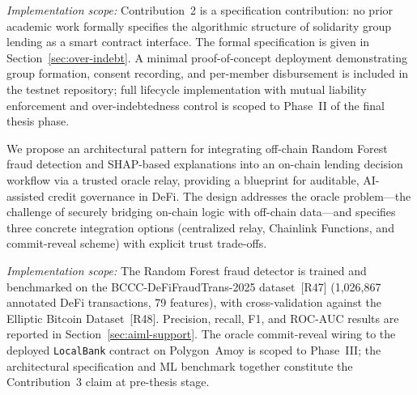 \documentclass[12pt,a4paper]{report}
\begin{document}
\begin{description}[leftmargin=0pt]
\textit{Implementation scope:} Contribution~2 is a specification contribution: no prior academic work formally specifies the algorithmic structure of solidarity group lending as a smart contract interface. The formal specification is given in Section~\ref{sec:over-indebt}. A minimal proof-of-concept deployment demonstrating group formation, consent recording, and per-member disbursement is included in the testnet repository; full lifecycle implementation with mutual liability enforcement and over-indebtedness control is scoped to Phase~II of the final thesis phase.

\item[\textbf{Contribution 3 --- Oracle-Mediated AI/ML Integration with Explainability.}]
We propose an architectural pattern for integrating off-chain Random Forest fraud detection and SHAP-based explanations into an on-chain lending decision workflow via a trusted oracle relay, providing a blueprint for auditable, AI-assisted credit governance in DeFi. The design addresses the oracle problem---the challenge of securely bridging on-chain logic with off-chain data---and specifies three concrete integration options (centralized relay, Chainlink Functions, and commit-reveal scheme) with explicit trust trade-offs.

\textit{Implementation scope:} The Random Forest fraud detector is trained and benchmarked on the BCCC-DeFiFraudTrans-2025 dataset~[R47] (1,026,867 annotated DeFi transactions, 79 features), with cross-validation against the Elliptic Bitcoin Dataset~[R48]. Precision, recall, F1, and ROC-AUC results are reported in Section~\ref{sec:aiml-support}. The oracle commit-reveal wiring to the deployed \texttt{LocalBank} contract on Polygon~Amoy is scoped to Phase~III; the architectural specification and ML benchmark together constitute the Contribution~3 claim at pre-thesis stage.


\end{description}
\end{document}
